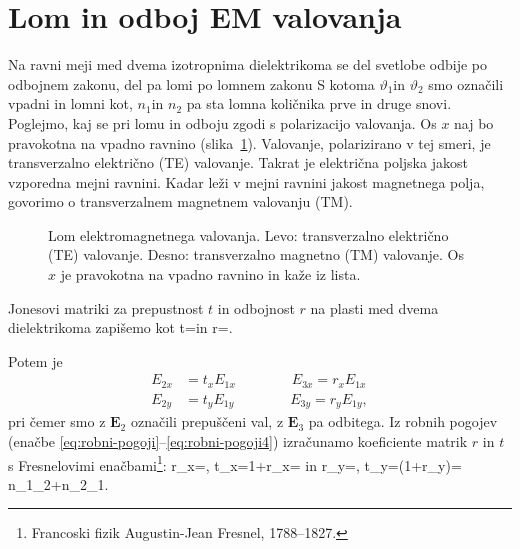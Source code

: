 \section{Lom in odboj EM valovanja}

Na ravni meji med dvema izotropnima dielektrikoma se del svetlobe
odbije po odbojnem zakonu, del pa lomi po lomnem zakonu
S kotoma $\vartheta_{1}$in $\vartheta_{2}$ smo označili vpadni in lomni
kot, $n_{1}$in $n_{2}$ pa sta lomna količnika prve in druge snovi.
Poglejmo, kaj se pri lomu in odboju zgodi s polarizacijo valovanja.
Os $x$ naj bo pravokotna na vpadno ravnino (slika~\ref{fig:Lom}). 
Valovanje, polarizirano v tej smeri, je transverzalno električno
(TE) valovanje. 
Takrat je električna poljska jakost vzporedna mejni ravnini. 
Kadar leži v mejni ravnini jakost magnetnega polja, govorimo o transverzalnem
magnetnem valovanju (TM).\\

\begin{figure}[h]
\centering {} 
  
\caption{Lom elektromagnetnega valovanja. Levo: transverzalno električno (TE) valovanje. 
Desno: transverzalno magnetno (TM) valovanje. Os $x$ je pravokotna na vpadno ravnino 
in kaže iz lista.}
\label{fig:Lom}
\end{figure}

Jonesovi matriki za prepustnost $t$ in odbojnost $r$ 
na plasti med dvema dielektrikoma zapišemo kot 
\beq
 t=\left[\begin{array}{cc}
t_{x} & 0\\
0 & t_{y}
\end{array}\right]
 \qquad \textrm{in} \qquad 
 r=\left[\begin{array}{cc}
r_{x} & 0\\
0 & r_{y}
\end{array}\right].
\eeq

Potem je 
\begin{align}
E_{2x} & =t_{x}E_{1x} \qquad \qquad E_{3x} =r_{x}E_{1x}\\
E_{2y} & =t_{y}E_{1y} \qquad \qquad E_{3y}=r_{y}E_{1y},
\end{align}
pri čemer smo z $\mathbf{E}_{2}$ označili prepuščeni val, z $\mathbf{E}_{3}$ pa odbitega.
Iz robnih pogojev (enačbe \ref{eq:robni-pogoji}--\ref{eq:robni-pogoji4}) 
izračunamo koeficiente matrik
$r$ in $t$ s Fresnelovimi 
enačbami\footnote{Francoski fizik Augustin-Jean Fresnel, 1788--1827.}:
\beq
r_{x}=,
\qquad t_{x}=1+r_{x}=
\eeq
in
\beq
r_{y}=,
\qquad t_{y}=(1+r_{y})=
{n_{1}\cos\vartheta_{2}+n_{2}\cos\vartheta_{1}}.
\eeq

